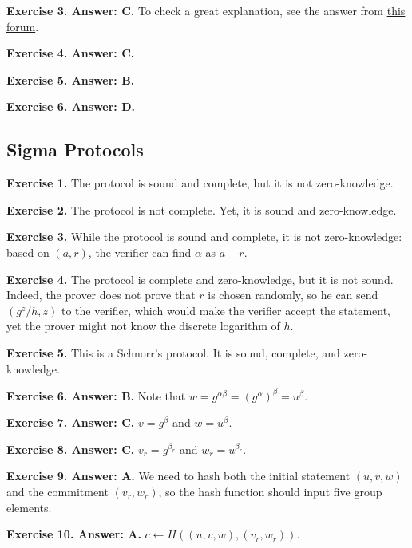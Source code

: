 \documentclass[../../book]{subfiles}
\begin{document}
\textbf{Exercise 3. Answer: C.} To check a great explanation, see the answer
from
\href{https://crypto.stackexchange.com/questions/9528/zero-knowledge-proof-using-quadratic-residue-why-two-options}{this
forum}.

\textbf{Exercise 4. Answer: C.}

\textbf{Exercise 5. Answer: B.}

\textbf{Exercise 6. Answer: D.}

\subsection*{Sigma Protocols}

\textbf{Exercise 1.} The protocol is sound and complete, but it is not zero-knowledge.

\textbf{Exercise 2.} The protocol is not complete. Yet, it is sound and zero-knowledge.

\textbf{Exercise 3.} While the protocol is sound and complete, it is not zero-knowledge: 
based on $(a,r)$, the verifier can find $\alpha$ as $a-r$.

\textbf{Exercise 4.} The protocol is complete and zero-knowledge, but it is not
sound. Indeed, the prover does not prove that $r$ is chosen randomly, so he can
send $(g^z/h, z)$ to the verifier, which would make the verifier accept the
statement, yet the prover might not know the discrete logarithm of $h$.

\textbf{Exercise 5.} This is a Schnorr's protocol. It is sound, complete, and
zero-knowledge.

\textbf{Exercise 6. Answer: B.} Note that
$w=g^{\alpha\beta}=(g^{\alpha})^{\beta}=u^{\beta}$. 

\textbf{Exercise 7. Answer: C.} $v=g^{\beta}$ and $w=u^{\beta}$.

\textbf{Exercise 8. Answer: C.} $v_r=g^{\beta_r}$ and $w_r=u^{\beta_r}$.

\textbf{Exercise 9. Answer: A.} We need to hash both the initial statement
$(u,v,w)$ and the commitment $(v_r,w_r)$, so the hash function should input five 
group elements.

\textbf{Exercise 10. Answer: A.} $c \gets H((u,v,w),(v_r,w_r))$.
\end{document}
